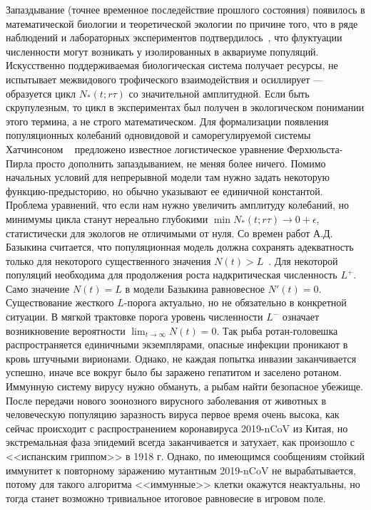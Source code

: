 \documentclass[a4paper,11pt,twoside]{article}
\begin{document}
Запаздывание (точнее временное последействие прошлого состояния) появилось в математической биологии и теоретической экологии по причине того, что в ряде наблюдений и лабораторных экспериментов подтвердилось~\cite{Nicholson1954}, что флуктуации численности могут возникать у изолированных в аквариуме популяций. Искусственно поддерживаемая биологическая система получает ресурсы, не испытывает межвидового трофического взаимодействия и осиллирует --- образуется цикл $N_*(t;r\tau)$ со значительной амплитудной. Если быть скрупулезным, то цикл в экспериментах был получен в экологическом понимании этого термина, а не строго математическом. Для формализации появления популяционных колебаний одновидовой и саморегулируемой системы Хатчинсоном ~\cite{Hutchinson1978}
предложено известное логистическое уравнение Ферхюльста-Пирла просто дополнить запаздыванием, не меняя более ничего. Помимо начальных условий для непрерывной модели там нужно задать некоторую функцию-предысторию, но обычно указывают ее единичной константой. Проблема уравнений, что если нам нужно увеличить амплитуду колебаний, но минимумы цикла станут нереально глубокими $\min N_*(t;r\tau)\to0+\epsilon$, статистически для экологов не отличимыми от нуля. Со времен работ А.Д. Базыкина считается, что  популяционная модель должна сохранять адекватность только для некоторого существенного значения $N(t)>L$~\cite{Berezansky}. Для некоторой популяций необходима для продолжения роста надкритическая численность $L^+$. Само значение $N(t)=L$ в модели Базыкина равновесное $N\prime (t)=0$. Существование жесткого $L$-порога актуально, но не обязательно в конкретной ситуации. В мягкой трактовке порога уровень численности $L^-$ означает возникновение вероятности $\lim_{t\to\infty}N(t)=0$.  Так рыба ротан-головешка распространяется единичными экземплярами, опасные инфекции проникают в кровь штучными вирионами. Однако, не каждая попытка инвазии заканчивается успешно, иначе все вокруг было бы заражено гепатитом и заселено ротаном. Иммунную систему вирусу нужно обмануть, а рыбам найти безопасное убежище. После передачи нового зоонозного вирусного заболевания от животных в человеческую популяцию заразность вируса первое время очень высока, как сейчас происходит с распространением коронавируса 2019-nCoV из Китая, но экстремальная фаза эпидемий всегда заканчивается и затухает, как произошло с <<испанским гриппом>> в 1918 г. Однако, по имеющимся сообщениям стойкий иммунитет к повторному заражению мутантным 2019-nCoV не вырабатывается, потому для такого алгоритма <<иммунные>> клетки окажутся неактуальны, но тогда станет возможно тривиальное итоговое равновесие в игровом поле.
\end{document}
